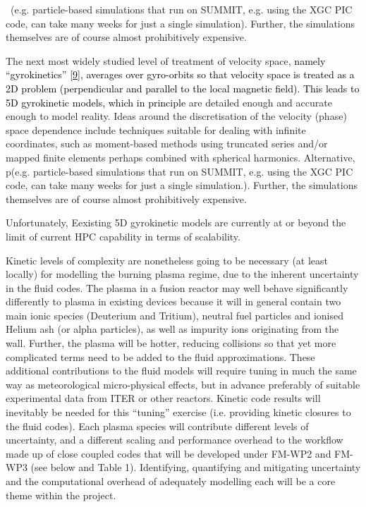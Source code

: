 \documentclass[a4paper]{article}
\newcommand\textstyleInternetlink[1]{\textcolor{blue}{#1}}
\begin{document}
\ (e.g. particle-based simulations that run on SUMMIT, e.g. using the XGC PIC code, can take many weeks for just a
single simulation). Further, the simulations themselves are of course almost prohibitively expensive.


\bigskip

The next most widely studied level of treatment of velocity space, \textcolor{black}{namely ``gyrokinetics''
}\href{https://en.wikipedia.org/wiki/Gyrokinetics}{\textstyleInternetlink{\textcolor{black}{[9]}}}\textcolor{black}{,
averages over gyro-orbits so that velocity space is treated as a 2D problem (perpendicular and parallel to the local
magnetic field). This leads to 5D gyrokinetic models, which in principle }are detailed enough and accurate enough to
model reality. Ideas around the discretisation of the velocity (phase) space dependence include techniques suitable for
dealing with infinite coordinates, such as moment-based methods using truncated series and/or mapped finite elements
perhaps combined with spherical harmonics. Alternative, p(e.g. particle-based simulations that run on SUMMIT, e.g.
using the XGC PIC code, can take many weeks for just a single simulation.). Further, the simulations themselves are of
course almost prohibitively expensive.


\bigskip

Unfortunately, Eexisting 5D gyrokinetic models are currently at or beyond the limit of current HPC capability in terms
of scalability.


\bigskip

Kinetic levels of complexity are nonetheless going to be necessary (at least locally) for modelling the burning plasma
regime, due to the inherent uncertainty in the fluid codes. The plasma in a fusion reactor may well behave
significantly differently to plasma in existing devices because it will in general contain two main ionic species
(Deuterium and Tritium), neutral fuel particles and ionised Helium ash (or alpha particles), as well as impurity ions
originating from the wall. Further, the plasma will be hotter, reducing collisions so that yet more complicated terms
need to be added to the fluid approximations. These additional contributions to the fluid models will require tuning in
much the same way as meteorological micro-physical effects, but in advance preferably of suitable experimental data
from ITER or other reactors. Kinetic code results will inevitably be needed for this ``tuning'' exercise (i.e.
providing kinetic closures to the fluid codes). Each plasma species will contribute different levels of uncertainty,
and a different scaling and performance overhead to the workflow made up of close coupled codes that will be developed
under FM-WP2 and FM-WP3 (see below and Table 1). Identifying, quantifying and mitigating uncertainty and the
computational overhead of adequately modelling each will be a core theme within the project.
\end{document}
